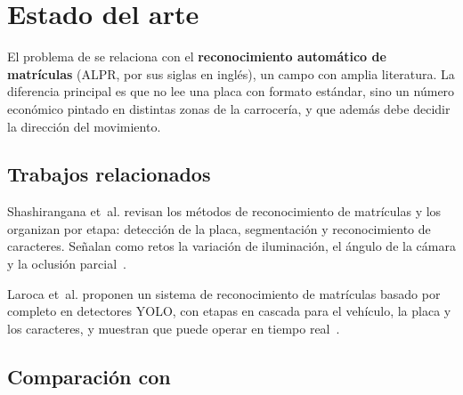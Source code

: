 \chapter{Estado del arte}
\label{cap:estado}

El problema de \saru{} se relaciona con el \textbf{reconocimiento
automático de matrículas} (ALPR, por sus siglas en inglés), un campo con
amplia literatura. La diferencia principal es que \saru{} no lee una placa
con formato estándar, sino un número económico pintado en distintas zonas
de la carrocería, y que además debe decidir la dirección del movimiento.

\section{Trabajos relacionados}

\begin{description}[style=nextline]
  \item[Revisión de métodos de ALPR] Shashirangana et~al. revisan los
        métodos de reconocimiento de matrículas y los organizan por etapa:
        detección de la placa, segmentación y reconocimiento de caracteres.
        Señalan como retos la variación de iluminación, el ángulo de la
        cámara y la oclusión parcial~\cite{shashirangana2021alpr}.
  \item[ALPR en tiempo real con YOLO] Laroca et~al. proponen un sistema de
        reconocimiento de matrículas basado por completo en detectores
        YOLO, con etapas en cascada para el vehículo, la placa y los
        caracteres, y muestran que puede operar en tiempo
        real~\cite{laroca2018yolo}.
\end{description}

\section{Comparación con \saru{}}

